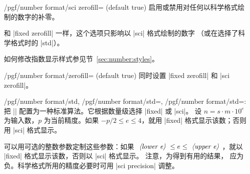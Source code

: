 \documentclass[a4paper,doc2]{ltxdoc}
\begin{document}
\begin{key}{/pgf/number format/sci zerofill=  (default true)}
    启用或禁用对任何以科学格式绘制的数字的补零。
\begin{codeexample}[]
\hspace{1em}
\hspace{1em}
\hspace{1em}
\hspace{1em}
\end{codeexample}
    和 |fixed zerofill| 一样，这个选项只影响以 |sci| 格式绘制的数字
    （或在选择了科学格式时的 |std|）。

    如何修改指数显示样式参见节~\ref{sec:number:styles}。
\end{key}

\begin{stylekey}{/pgf/number format/zerofill= (default true)}
    同时设置 |fixed zerofill| 和 |sci zerofill|。
\end{stylekey}

\begin{keylist}{/pgf/number format/std,%
    /pgf/number format/std=,
    /pgf/number format/std=:%
}
    把 |\pgfmathprintnumber| 配置为一种标准算法。它根据数量级选择 |fixed| 或 |sci|。
    设 $n=s \cdot m \cdot 10^e$ 为输入数，$p$ 为当前精度。如果
    $-p/2 \le e \le 4$，就用 |fixed| 格式显示该数；否则用 |sci| 格式显示。

\begin{codeexample}[]
\hspace{1em}
\hspace{1em}
\hspace{1em}
\hspace{1em}
\end{codeexample}
    可以用可选的整数参数定制这些参数：如果 $\text{\meta{lower e}} \le e \le
    \text{\meta{upper e}}$，就以 |fixed| 格式显示该数，否则以 |sci| 格式显示。
    注意，为得到有用的结果， 应为负。科学格式所用的精度必要时可用
    |sci precision| 调整。

\end{keylist}
\end{document}
